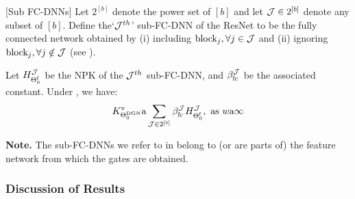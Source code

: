 \begin{definition}\label{def:subfcdnn}[Sub FC-DNNs]
Let $2^{[b]}$ denote the power set of $[b]$ and let $\mathcal{J}\in 2^{[b]}$ denote any subset of $[b]$. Define the`$\mathcal{J}^{th}$' sub-FC-DNN of the ResNet to be the fully connected network obtained by (i) including  $\text{block}_{j},\forall j\in \mathcal{J}$  and (ii) ignoring $\text{block}_{j},\forall j\notin \mathcal{J}$ (see ).
\end{definition}
\begin{theorem}
\label{th:res} Let $H^{\mathcal{J}}_{\Theta^{\textrm{f}}_0}$ be the NPK of the $\mathcal{J}^{th}$ sub-FC-DNN, and $\beta_{\text{fc}}^{\mathcal{J}}$ be the associated constant. Under , we have:
\begin{align*}
K^{\text{v}}_{\Theta^{\text{DGN}}_0}{\textnormal{a}} \sum_{\mathcal{J}\in 2^{[b]}}  \beta_{\text{fc}}^{\mathcal{J}} H^{\mathcal{J}}_{\Theta^{\textrm{f}}_0}, \,\, \text{as}\,\,  w{\textnormal{a}}\infty
\end{align*}
\end{theorem}
\textbf{Note.} The sub-FC-DNNs we refer to in  belong to (or are parts of) the feature network from which the gates are obtained. 


\subsubsection{Discussion of Results}





